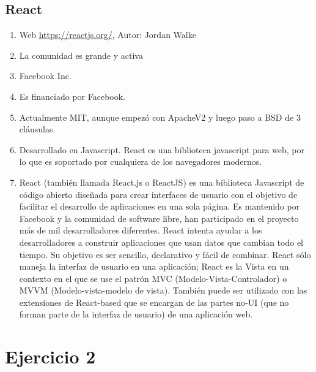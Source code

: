 \subsection{React}
\begin{enumerate}
    \item Web \url{https://reactjs.org/}, Autor: Jordan Walke
    \item La comunidad es grande y activa
    \item Facebook Inc.
    \item Es financiado por Facebook.
    \item Actualmente MIT, aunque empezó con ApacheV2 y luego paso a BSD de 3 cláusulas.
    \item Desarrollado en Javascript. React es una biblioteca javascript para web, por lo que es soportado por cualquiera de los navegadores modernos.
    \item React (también llamada React.js o ReactJS) es una biblioteca Javascript de código abierto diseñada para crear interfaces de usuario con el objetivo de facilitar el desarrollo de aplicaciones en una sola página. Es mantenido por Facebook y la comunidad de software libre, han participado en el proyecto más de mil desarrolladores diferentes. React intenta ayudar a los desarrolladores a construir aplicaciones que usan datos que cambian todo el tiempo. Su objetivo es ser sencillo, declarativo y fácil de combinar. React sólo maneja la interfaz de usuario en una aplicación; React es la Vista en un contexto en el que se use el patrón MVC (Modelo-Vista-Controlador) o MVVM (Modelo-vista-modelo de vista). También puede ser utilizado con las extensiones de React-based que se encargan de las partes no-UI (que no forman parte de la interfaz de usuario) de una aplicación web.
\end{enumerate}

\clearpage
\section{Ejercicio 2}

